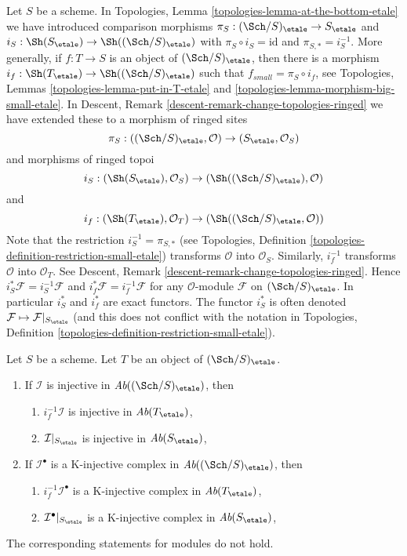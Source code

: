 \noindent
Let $S$ be a scheme. In
Topologies, Lemma \ref{topologies-lemma-at-the-bottom-etale}
we have introduced comparison morphisms
$\pi_S : (\Sch/S)_\etale \to S_\etale$ and
$i_S : \Sh(S_\etale) \to \Sh((\Sch/S)_\etale)$
with $\pi_S \circ i_S = \text{id}$ and $\pi_{S, *} = i_S^{-1}$.
More generally, if $f : T \to S$ is an object of $(\Sch/S)_\etale$,
then there is a morphism $i_f : \Sh(T_\etale) \to \Sh((\Sch/S)_\etale)$
such that $f_{small} = \pi_S \circ i_f$, see
Topologies, Lemmas \ref{topologies-lemma-put-in-T-etale} and
\ref{topologies-lemma-morphism-big-small-etale}. In
Descent, Remark \ref{descent-remark-change-topologies-ringed}
we have extended these to a morphism of ringed sites
$$
\pi_S : ((\Sch/S)_\etale, \mathcal{O}) \to (S_\etale, \mathcal{O}_S)
$$
and morphisms of ringed topoi
$$
i_S : (\Sh(S_\etale), \mathcal{O}_S) \to (\Sh((\Sch/S)_\etale), \mathcal{O})
$$
and
$$
i_f : (\Sh(T_\etale), \mathcal{O}_T) \to (\Sh((\Sch/S)_\etale, \mathcal{O}))
$$
Note that the restriction $i_S^{-1} = \pi_{S, *}$ (see
Topologies, Definition \ref{topologies-definition-restriction-small-etale})
transforms $\mathcal{O}$ into $\mathcal{O}_S$.
Similarly, $i_f^{-1}$ transforms $\mathcal{O}$ into $\mathcal{O}_T$.
See Descent, Remark \ref{descent-remark-change-topologies-ringed}.
Hence $i_S^*\mathcal{F} = i_S^{-1}\mathcal{F}$ and
$i_f^*\mathcal{F} = i_f^{-1}\mathcal{F}$ for any $\mathcal{O}$-module
$\mathcal{F}$ on $(\Sch/S)_\etale$. In particular $i_S^*$ and $i_f^*$
are exact functors. The functor $i_S^*$ is often denoted
$\mathcal{F} \mapsto \mathcal{F}|_{S_\etale}$ (and this does not
conflict with the notation in
Topologies, Definition \ref{topologies-definition-restriction-small-etale}).

\begin{lemma}
\label{lemma-compare-injectives}
Let $S$ be a scheme. Let $T$ be an object of $(\Sch/S)_\etale$.
\begin{enumerate}
\item If $\mathcal{I}$ is injective in $\textit{Ab}((\Sch/S)_\etale)$, then
\begin{enumerate}
\item $i_f^{-1}\mathcal{I}$ is injective in $\textit{Ab}(T_\etale)$,
\item $\mathcal{I}|_{S_\etale}$ is injective in $\textit{Ab}(S_\etale)$,
\end{enumerate}
\item If $\mathcal{I}^\bullet$ is a K-injective complex
in $\textit{Ab}((\Sch/S)_\etale)$, then
\begin{enumerate}
\item $i_f^{-1}\mathcal{I}^\bullet$ is a K-injective complex in
$\textit{Ab}(T_\etale)$,
\item $\mathcal{I}^\bullet|_{S_\etale}$ is a K-injective complex in
$\textit{Ab}(S_\etale)$,
\end{enumerate}
\end{enumerate}
The corresponding statements for modules do not hold.
\end{lemma}

